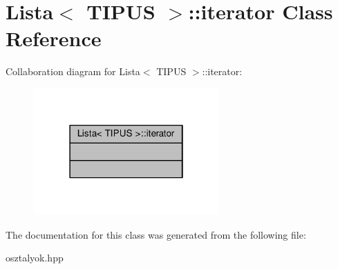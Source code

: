 \hypertarget{class_lista_1_1iterator}{}\section{Lista$<$ T\+I\+P\+US $>$\+:\+:iterator Class Reference}
\label{class_lista_1_1iterator}


Collaboration diagram for Lista$<$ T\+I\+P\+US $>$\+:\+:iterator\+:
\nopagebreak
\begin{figure}[H]
\begin{center}
\leavevmode
\includegraphics[width=202pt]{class_lista_1_1iterator__coll__graph}
\end{center}
\end{figure}


The documentation for this class was generated from the following file\+:\begin{DoxyCompactItemize}
\item 
osztalyok.\+hpp\end{DoxyCompactItemize}

